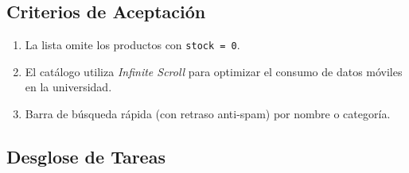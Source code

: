 \documentclass[11pt, letterpaper]{article}
\begin{document}
    \subsection{Criterios de Aceptación}
    \begin{enumerate}[label=\bfseries\arabic*.]
        \item La lista omite los productos con \texttt{stock = 0}.
        \item El catálogo utiliza \textit{Infinite Scroll} para optimizar el consumo de datos móviles en la universidad.
        \item Barra de búsqueda rápida (con retraso anti-spam) por nombre o categoría.
    \end{enumerate}
   
    \subsection{Desglose de Tareas}
\end{document}
